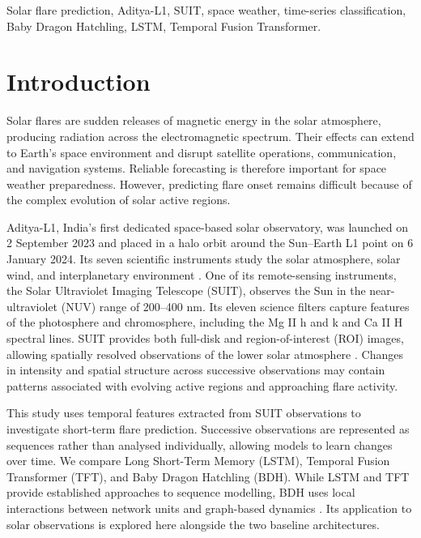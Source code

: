\documentclass[oneside]{ieeeaccess}
\begin{document}
\begin{keywords}
Solar flare prediction, Aditya-L1, SUIT, space weather, time-series classification, Baby Dragon Hatchling, LSTM, Temporal Fusion Transformer.
\end{keywords}

\titlepgskip=-21pt
\maketitle

\section{Introduction}

Solar flares are sudden releases of magnetic energy in the solar atmosphere, producing radiation across the electromagnetic spectrum. Their effects can extend to Earth's space environment and disrupt satellite operations, communication, and navigation systems. Reliable forecasting is therefore important for space weather preparedness. However, predicting flare onset remains difficult because of the complex evolution of solar active regions.

Aditya-L1, India's first dedicated space-based solar observatory, was launched on 2 September 2023 and placed in a halo orbit around the Sun--Earth L1 point on 6 January 2024. Its seven scientific instruments study the solar atmosphere, solar wind, and interplanetary environment \cite{ref1}. One of its remote-sensing instruments, the Solar Ultraviolet Imaging Telescope (SUIT), observes the Sun in the near-ultraviolet (NUV) range of 200--400 nm. Its eleven science filters capture features of the photosphere and chromosphere, including the Mg II h and k and Ca II H spectral lines. SUIT provides both full-disk and region-of-interest (ROI) images, allowing spatially resolved observations of the lower solar atmosphere \cite{ref2}. Changes in intensity and spatial structure across successive observations may contain patterns associated with evolving active regions and approaching flare activity.

This study uses temporal features extracted from SUIT observations to investigate short-term flare prediction. Successive observations are represented as sequences rather than analysed individually, allowing models to learn changes over time. We compare Long Short-Term Memory (LSTM), Temporal Fusion Transformer (TFT), and Baby Dragon Hatchling (BDH). While LSTM and TFT provide established approaches to sequence modelling, BDH uses local interactions between network units and graph-based dynamics \cite{ref3}. Its application to solar observations is explored here alongside the two baseline architectures.
\end{document}
